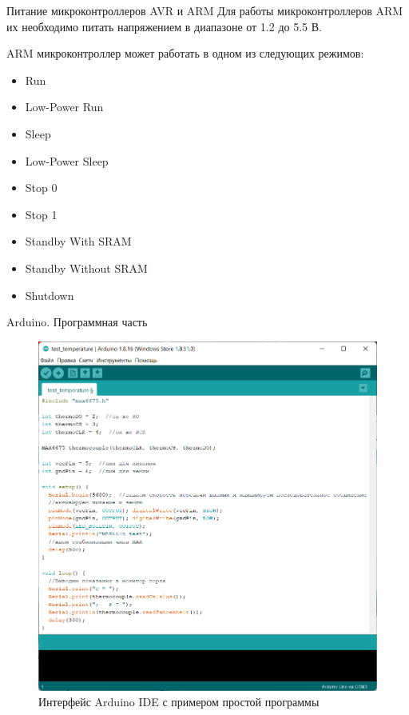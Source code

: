 \documentclass[12pt,a4paper,mathserif]{beamer}
\begin{document}
\begin{frame}{Питание  микроконтроллеров AVR и ARM}
    \setlength{\parindent}{0.5cm}
    Для работы микроконтроллеров ARM их необходимо питать напряжением в диапазоне от 1.2 до 5.5 В.

    ARM микроконтроллер может работать в одном из следующих режимов:
    
    \begin{itemize}
        \item Run
        
        \item Low-Power Run
        
        \item Sleep
        
        \item Low-Power Sleep
        
        \item Stop 0
        
        \item Stop 1
        
        \item Standby With SRAM
        
        \item Standby Without SRAM
        
        \item Shutdown
    \end{itemize}
\end{frame}

\begin{frame}{Arduino. Программная часть}
    \begin{figure}
        \centering
        \includegraphics[scale=0.33]{Arduino_IDE.png}
        \caption{Интерфейс Arduino IDE с примером простой программы}
        \label{fig:ide}
    \end{figure}
\end{frame}
\end{document}
